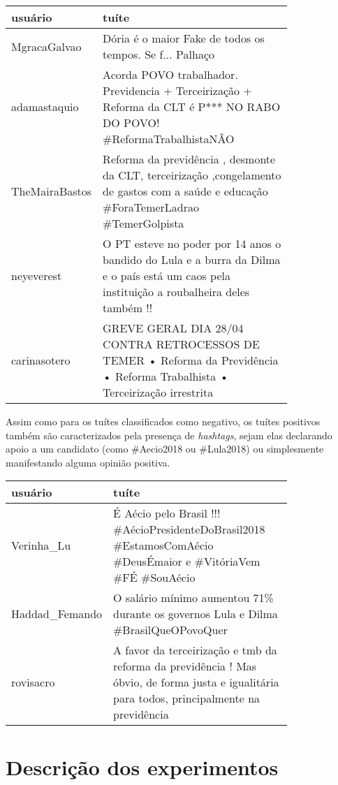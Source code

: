 \begin{center}
	\begin{tabular}{| l | p{0.8\linewidth} |}
		\hline
		usuário & tuíte \\
		\hline
		MgracaGalvao & Dória é o maior Fake de todos os tempos. Se f... Palhaço \\
		\hline
		adamastaquio & Acorda POVO trabalhador. Previdencia + Terceirização + Reforma da CLT é P*** NO RABO DO POVO! \#ReformaTrabalhistaNÃO \\
		\hline
		TheMairaBastos & Reforma da previdência , desmonte da CLT, terceirização ,congelamento de gastos com a saúde e educação \#ForaTemerLadrao \#TemerGolpista \\
		\hline
		neyeverest & O PT esteve no poder por 14 anos o bandido do Lula e a burra da Dilma e o país está um caos pela instituição a roubalheira deles também !! \\
		\hline
		carinasotero & GREVE GERAL DIA 28/04 CONTRA RETROCESSOS DE TEMER • Reforma da Previdência • Reforma Trabalhista • Terceirização irrestrita \\
		\hline
	\end{tabular}
\end{center}

Assim como para os tuítes classificados como negativo, os tuítes positivos também são 
caracterizados pela presença de \textit{hashtags}, sejam elas declarando apoio a um candidato
(como \#Aecio2018 ou \#Lula2018) ou simplesmente manifestando alguma opinião positiva. 

\begin{center}
	\begin{tabular}{| l | p{0.8\linewidth} |}
		\hline
		usuário & tuíte \\
		\hline
		Verinha_Lu & É Aécio pelo Brasil !!! \#AécioPresidenteDoBrasil2018 \#EstamosComAécio \#DeusÉmaior e \#VitóriaVem \#FÉ \#SouAécio \\
		\hline
		Haddad_Femando & O salário mínimo aumentou 71\% durante os governos Lula e Dilma \#BrasilQueOPovoQuer \\
		\hline
		rovisacro & A favor da terceirização e tmb da reforma da previdência ! Mas óbvio, de forma justa e igualitária para todos, principalmente na previdência \\
		\hline	
	\end{tabular}
\end{center}

\section{Descrição dos experimentos}

